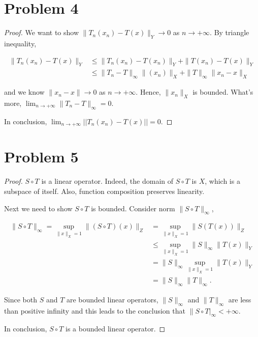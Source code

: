 \documentclass[12pt]{article}
\begin{document}
\section*{Problem 4}

\begin{proof}

We want to show $\| T_n(x_n) - T(x) \|_Y \rightarrow 0$ as $n \rightarrow +\infty$. By triangle inequality,


$$
\begin{aligned}
\|T_n(x_n) - T(x)\|_Y & \leqslant \|T_n(x_n) - T(x_n)\|_Y + \|T(x_n) - T(x)\|_Y \\ 
& \leqslant \|T_n- T\|_\infty \|(x_n)\|_X + \|T\|_\infty \|x_n - x\|_X 
\end{aligned}
$$

and we know $\|x_n - x\| \rightarrow 0$ as $n\rightarrow +\infty$. Hence, $\|x_n\|_X$ is bounded. What's more, $\lim_{n\rightarrow +\infty} \|T_n - T\|_\infty = 0$.

In conclusion, $\lim_{n\rightarrow +\infty} ||T_n(x_n) - T(x)|| = 0$.

\end{proof}

\section*{Problem 5}

\begin{proof}

$S\circ T$ is a linear operator. Indeed, the domain of $S\circ T$ is $X$, which is a subspace of itself. Also, function composition preserves linearity.

Next we need to show $S\circ T$ is bounded. Consider norm $\|S\circ T\|_\infty$,

$$
\begin{aligned}
\|S\circ T\|_\infty = \sup_{\|x\|_X = 1} \|(S\circ T)(x)\|_Z & = 
\sup_{\|x\|_X = 1} \|S(T(x))\|_Z \\
& \leqslant \sup_{\|x\|_X = 1} \|S\|_\infty \|T(x)\|_Y \\
& = \|S\|_\infty \sup_{\|x\|_X = 1} \|T(x)\|_Y \\
& = \|S\|_\infty \|T\|_\infty.
\end{aligned}
$$

Since both $S$ and $T$ are bounded linear operators, $\|S\|_\infty$ and $\|T\|_\infty$ are less than positive infinity and this leads to the conclusion that $\|S\circ T|_\infty < +\infty$. 

In conclusion, $S\circ T$ is a bounded linear operator.

\end{proof}
\end{document}
